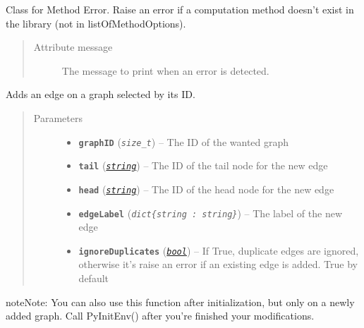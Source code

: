 \documentclass[letterpaper,10pt,english]{sphinxmanual}
\begin{document}

\begin{fulllineitems}
\label{doc:PythonGedLib.MethodError}
Class for Method Error. Raise an error if a computation method doesn't exist in the library (not in listOfMethodOptions).
\begin{quote}\begin{description}
\item[{Attribute message}] \leavevmode
The message to print when an error is detected.

\end{description}\end{quote}

\end{fulllineitems}


\begin{fulllineitems}
\label{doc:PythonGedLib.PyAddEdge}
Adds an edge on a graph selected by its ID.
\begin{quote}\begin{description}
\item[{Parameters}] \leavevmode\begin{itemize}
\item {} 
\textbf{\texttt{graphID}} (\emph{\texttt{size\_t}}) -- The ID of the wanted graph

\item {} 
\textbf{\texttt{tail}} (\href{https://docs.python.org/3/library/string.html\#module-string}{\emph{\texttt{string}}}) -- The ID of the tail node for the new edge

\item {} 
\textbf{\texttt{head}} (\href{https://docs.python.org/3/library/string.html\#module-string}{\emph{\texttt{string}}}) -- The ID of the head node for the new edge

\item {} 
\textbf{\texttt{edgeLabel}} (\emph{\texttt{dict\{string : string\}}}) -- The label of the new edge

\item {} 
\textbf{\texttt{ignoreDuplicates}} (\href{https://docs.python.org/3/library/functions.html\#bool}{\emph{\texttt{bool}}}) -- If True, duplicate edges are ignored, otherwise it's raise an error if an existing edge is added. True by default

\end{itemize}

\end{description}\end{quote}

\begin{notice}{note}{Note:}
You can also use this function after initialization, but only on a newly added graph. Call PyInitEnv() after you're finished your modifications.
\end{notice}

\end{fulllineitems}
\end{document}
